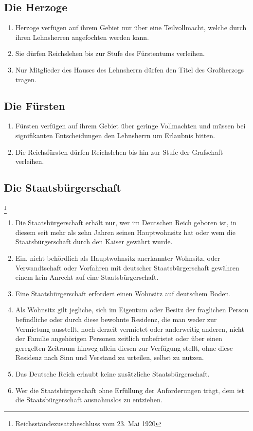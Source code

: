 \documentclass{article}
\begin{document}
\subsection{Die Herzoge}
\begin{enumerate}[(1)]
    \item Herzoge verfügen auf ihrem Gebiet nur über eine Teilvollmacht, welche durch ihren Lehnsherren angefochten werden kann.
    \item Sie dürfen Reichslehen bis zur Stufe des Fürstentums verleihen.
    \item Nur Mitglieder des Hauses des Lehnsherrn dürfen den Titel des Großherzogs tragen.
\end{enumerate}

\subsection{Die Fürsten}
\begin{enumerate}[(1)]
    \item Fürsten verfügen auf ihrem Gebiet über geringe Vollmachten und müssen bei signifikanten Entscheidungen den Lehnsherrn um Erlaubnis bitten.
    \item Die Reichsfürsten dürfen Reichslehen bis hin zur Stufe der Grafschaft verleihen.
\end{enumerate}

\subsection{Die Staatsbürgerschaft}\footnote{Reichsständezusatzbeschluss vom 23. Mai 1920}
\begin{enumerate}[(1)]
    \item Die Staatsbürgerschaft erhält nur, wer im Deutschen Reich geboren ist, in diesem seit mehr als zehn Jahren seinen Hauptwohnsitz hat oder wem die Staatsbürgerschaft durch den Kaiser gewährt wurde.
    \item Ein, nicht behördlich als Hauptwohnsitz anerkannter Wohnsitz, oder Verwandtschaft oder Vorfahren mit deutscher Staatsbürgerschaft gewähren einem kein Anrecht auf eine Staatsbürgerschaft.
    \item Eine Staatsbürgerschaft erfordert einen Wohnsitz auf deutschem Boden.
    \item Als Wohnsitz gilt jegliche, sich im Eigentum oder Besitz der fraglichen Person befindliche oder durch diese bewohnte Residenz, die man weder zur Vermietung ausstellt, noch derzeit vermietet oder anderweitig anderen, nicht der Familie angehörigen 
    Personen zeitlich unbefristet oder über einen geregelten Zeitraum hinweg allein diesen zur Verfügung stellt, ohne diese Residenz nach Sinn und Verstand zu urteilen, selbst zu nutzen.
    \item Das Deutsche Reich erlaubt keine zusätzliche Staatsbürgerschaft.
    \item Wer die Staatsbürgerschaft ohne Erfüllung der Anforderungen trägt, dem ist die Staatsbürgerschaft ausnahmslos zu entziehen.
\end{enumerate}
\end{document}
